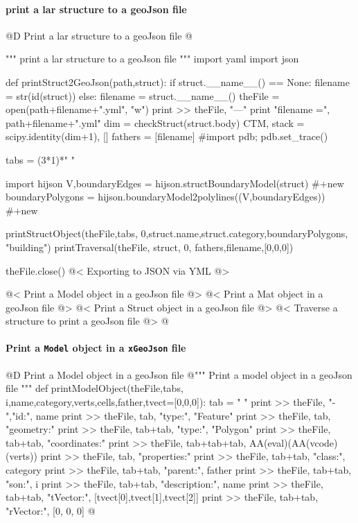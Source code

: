 \documentclass[11pt,oneside]{article}    %
\begin{document}
\paragraph{print a lar structure to a geoJson file}

@D Print a lar structure to a geoJson file
@{""" print a lar structure to a geoJson file """
import yaml
import json

    

def printStruct2GeoJson(path,struct):
    if struct.__name__() == None:
        filename = str(id(struct))
    else: 
        filename = struct.__name__()
    theFile = open(path+filename+".yml", "w")
    print >> theFile, "---"
    print "filename =", path+filename+".yml"
    dim = checkStruct(struct.body)
    CTM, stack = scipy.identity(dim+1), []
    fathers = [filename]
    #import pdb; pdb.set_trace()

    tabs = (3*1)*" "

    import hijson
    V,boundaryEdges = hijson.structBoundaryModel(struct)   #+new
    boundaryPolygons = hijson.boundaryModel2polylines((V,boundaryEdges))  #+new
    
    printStructObject(theFile,tabs, 0,struct.name,struct.category,boundaryPolygons, "building")
    printTraversal(theFile, struct, 0, fathers,filename,[0,0,0]) 

    theFile.close()
    @< Exporting to JSON via YML @>

@< Print a Model object in a geoJson file @>
@< Print a Mat object in a geoJson file @>
@< Print a Struct object in a geoJson file @>
@< Traverse a structure to print a geoJson file @>
@}

\paragraph{Print a \texttt{Model} object in a \texttt{xGeoJson} file}

@D Print a Model object in a geoJson file
@{""" Print a model object in a geoJson file """
def printModelObject(theFile,tabs, i,name,category,verts,cells,father,tvect=[0,0,0]):
    tab = "    "
    print >> theFile, "-   ","id:", name
    print >> theFile, tab, "type:", "Feature"
    print >> theFile, tab, "geometry:" 
    print >> theFile, tab+tab, "type:", "Polygon"
    print >> theFile, tab+tab, "coordinates:" 
    print >> theFile, tab+tab+tab, AA(eval)(AA(vcode)(verts))
    print >> theFile, tab, "properties:"
    print >> theFile, tab+tab, "class:", category
    print >> theFile, tab+tab, "parent:", father
    print >> theFile, tab+tab, "son:", i
    print >> theFile, tab+tab, "description:", name
    print >> theFile, tab+tab, "tVector:", [tvect[0],tvect[1],tvect[2]]
    print >> theFile, tab+tab, "rVector:", [0, 0, 0]
@}
\end{document}
